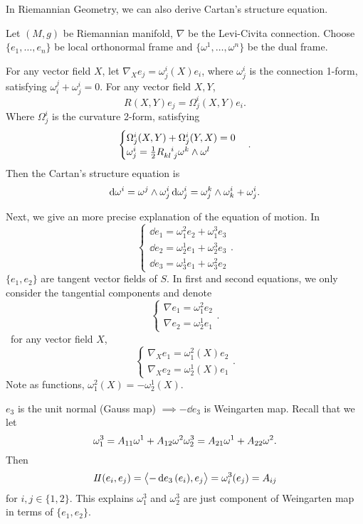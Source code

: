 In Riemannian Geometry, we can also derive Cartan's structure equation.

Let \((M,g)\) be Riemannian manifold, \(\nabla\) be the Levi-Civita connection.
Choose \(\{e_1,\ldots,e_n\}\) be local orthonormal frame and \(\{\omega^1,\ldots,
\omega^n\}\) be the dual frame.

For any vector field \(X\), let \(\nabla_X e_j=\omega_j^i(X)e_i\), where \(\omega_j^i\)
is the connection 1-form, satisfying \(\omega_i^j+\omega_j^i=0\).
For any vector field \(X,Y\), \[
    R(X,Y)e_j=\Omega_j^i(X,Y)e_i
.\] Where \(\Omega_j^i\) is the curvature 2-form, satisfying \[
    \begin{cases}
        \Omega_j^i(X,Y)+\Omega_j^i(Y,X)=0 \\ 
        \omega_j^i=\frac{1}{2}\tensor{R}{_k_l^i_j}\omega^k\wedge \omega^l
    \end{cases}
.\] Then the Cartan's structure equation is
\begin{equation}\label{eq:cartan-ndim}
    \dd{\omega^i}=\omega^j\wedge \omega_j^i \\
    \dd{\omega_j^i}=\omega_j^k\wedge \omega_k^i+\omega_j^i
.\end{equation}

Next, we give an more precise explanation of the equation of motion. In \[
    \begin{cases}
        \dd{e_1}=\omega_1^2e_2+\omega_1^3e_3 \\
        \dd{e_2}=\omega_2^1e_1+\omega_2^3e_3 \\
        \dd{e_3}=\omega_3^1e_1+\omega_3^2e_2
    \end{cases}
.\] \(\{e_1,e_2\}\) are tangent vector fields of \(S\). In first and second equations,
we only consider the tangential components and denote \[
    \begin{cases}
        \nabla e_1=\omega_1^2e_2 \\
        \nabla e_2=\omega_2^1e_1
    \end{cases}
.\] \ie\ for any vector field \(X\), \[
    \begin{cases}
        \nabla_X e_1=\omega_1^2(X)e_2 \\
        \nabla_X e_2=\omega_2^1(X)e_1
    \end{cases}
.\] Note as functions, \(\omega_1^2(X)=-\omega_2^1(X)\).

\(e_3\) is the unit normal (Gauss map) \(\implies-\dd{e_3}\) is Weingarten map.
Recall that we let \[
    \omega_1^3=A_{11}\omega^1+A_{12}\omega^2 \\
    \omega_2^3=A_{21}\omega^1+A_{22}\omega^2
.\] Then \[
    I\!I(e_i,e_j)=\left<-\dd{e_3}(e_i),e_j\right> =\omega_i^3(e_j)=A_{ij}
\] for \(i,j\in \{1,2\}\). This explains \(\omega_1^3\) and \(\omega_2^3\) are
just component of Weingarten map in terms of \(\{e_1,e_2\}\).

